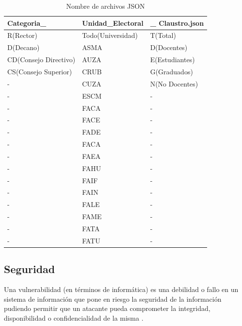 \begin{table}[htbp]
\begin{center}
\begin{tabular}{|l|l|l|}
\hline
Categoria\_ & Unidad\_Electoral & \_ Claustro.json\\
\hline \hline 
R(Rector) & Todo(Universidad) & T(Total)\\ \hline
D(Decano) & ASMA & D(Docentes)\\ \hline
CD(Consejo Directivo) & AUZA & E(Estudiantes)\\ \hline
CS(Consejo Superior) & CRUB & G(Graduados)\\ \hline
-& CUZA & N(No Docentes) \\ \hline
-& ESCM &- \\ \hline
-& FACA &- \\ \hline
-& FACE &- \\ \hline
-& FADE &- \\ \hline
-& FACA &- \\ \hline
-& FAEA &- \\ \hline
-& FAHU &- \\ \hline
-& FAIF &- \\ \hline
-& FAIN &- \\ \hline
-& FALE &- \\ \hline
-& FAME &- \\ \hline
-& FATA &- \\ \hline
-& FATU &- \\ \hline
\end{tabular}
\end{center}
\caption{Nombre de archivos JSON}
\label{tab:formatoJSON}
\end{table}

\subsection{Seguridad}
Una vulnerabilidad (en términos de informática) es una debilidad o fallo en un sistema de información que pone en riesgo la seguridad de la información pudiendo permitir que un atacante pueda comprometer la integridad, disponibilidad o confidencialidad de la misma \cite{definicionVulnerabilidad}.

